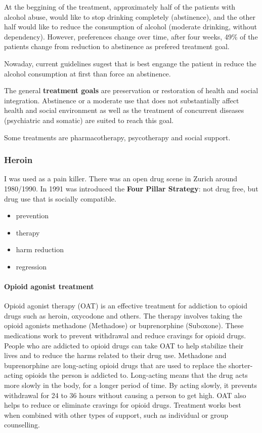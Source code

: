 \documentclass[12pt,article,oneside,a4paper]{memoir}
\begin{document}
At the beggining of the treatment, approximately half of the patients with
alcohol abuse, would like to stop drinking completely (abstinence), and the
other half would like to reduce the consumption of alcohol (moderate drinking,
without dependency). However, preferences change over time, after four weeks,
49\% of the patients change from reduction to abstinence as prefered treatment
goal.

Nowaday, current guidelines sugest that is best engange the patient in reduce
the alcohol consumption at first than force an abstinence.

The general \textbf{treatment goals} are preservation or restoration of health
and social integration. Abstinence or a moderate use that does not substantially
affect health and social environment as well as the treatment of concurrent
diseases (psychiatric and somatic) are suited to reach this goal.

Some treatments are pharmacotherapy, psycotherapy and social support.

\subsubsection{Heroin}
I was used as a pain killer. There was an open drug scene in Zurich around 1980/1990.
In 1991 was introduced the \textbf{Four Pillar Strategy}: not drug free, but
drug use that is socially compatible.
\begin{itemize}
\item prevention
\item therapy
\item harm reduction
\item regression
\end{itemize}

\paragraph{Opioid agonist treatment}
Opioid agonist therapy (OAT) is an effective treatment for addiction to opioid
drugs such as heroin, oxycodone and others. The therapy involves taking the
opioid agonists methadone (Methadose) or buprenorphine (Suboxone). These
medications work to prevent withdrawal and reduce cravings for opioid drugs.
People who are addicted to opioid drugs can take OAT to help stabilize their
lives and to reduce the harms related to their drug use.
Methadone and buprenorphine are long-acting opioid drugs that are used to
replace the shorter-acting opioids the person is addicted to. Long-acting means
that the drug acts more slowly in the body, for a longer period of time. By
acting slowly, it prevents withdrawal for 24 to 36 hours without causing a
person to get high. OAT also helps to reduce or eliminate cravings for opioid
drugs. Treatment works best when combined with other types of support, such as
individual or group counselling. 
\end{document}
